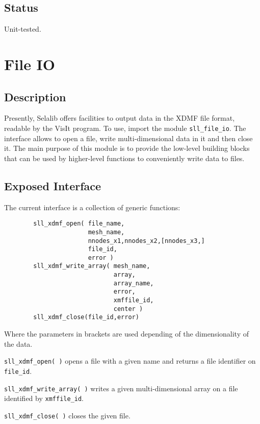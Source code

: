 \documentclass[]{report}   %
\begin{document}
\subsection{Status}
Unit-tested.

\section{File IO}

    \subsection{Description}
	Presently, Selalib offers facilities to output data in the XDMF file format, readable by the VisIt program. To use, import the module \verb+sll_file_io+. The interface allows to open a file, write multi-dimensional data in it and then close it. The main purpose of this module is to provide the low-level building blocks that can be used by higher-level functions to conveniently write data to files.

    \subsection{Exposed Interface}
    The current interface is a collection of generic functions:
    \begin{verbatim}
        sll_xdmf_open( file_name,
                       mesh_name,
                       nnodes_x1,nnodes_x2,[nnodes_x3,]
                       file_id,
                       error )
        sll_xdmf_write_array( mesh_name,
                              array,
                              array_name,
                              error,
                              xmffile_id,
                              center )
        sll_xdmf_close(file_id,error)
    \end{verbatim}
    Where the parameters in brackets are used depending of the dimensionality of the data.
    \begin{description}
       \item \verb+sll_xdmf_open( )+ opens a file with a given name and returns a file identifier on \verb+file_id+.
       \item \verb+sll_xdmf_write_array( )+ writes a given multi-dimensional array on a file identified by \verb+xmffile_id+.
       \item \verb+sll_xdmf_close( )+ closes the given file.
    \end{description}
\end{document}
